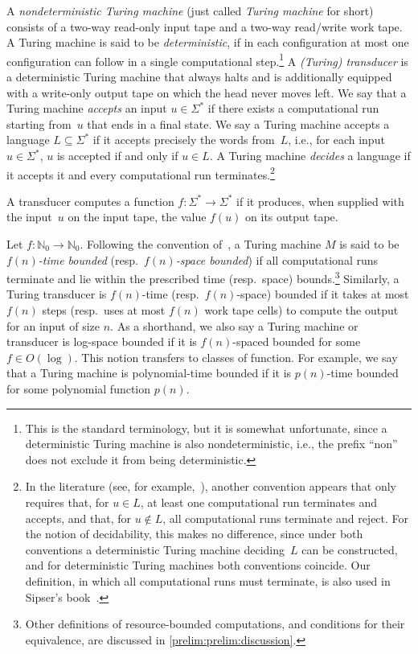 A \emph{nondeterministic Turing machine} (just called \emph{Turing machine} for short) consists of a two-way read-only input tape
and a two-way read/write work tape. 
A Turing machine is said to be \emph{deterministic}, if in each configuration
at most one configuration can follow in a single computational step.\footnote{This is the standard terminology, but it is somewhat unfortunate, since a deterministic Turing machine is also nondeterministic, i.e., the prefix ``non'' does not exclude
it from being deterministic.}
A \emph{(Turing) transducer} is a deterministic Turing machine that always halts and
is additionally equipped with a write-only output tape on which the head never moves left. 
We say that a Turing machine \emph{accepts} an input $u \in \Sigma^*$
if there exists a computational run starting from~$u$ that ends in a final state.
We say a Turing machine accepts a language $L \subseteq \Sigma^*$ if it accepts precisely the words from~$L$, i.e., for each input $u \in \Sigma^*$,
$u$ is accepted if and only if $u \in L$.
A Turing machine \emph{decides}
a language if it accepts it and every computational run terminates.\footnote{
	In the literature (see, for example,~\cite[Sec.~2.1.2]{DBLP:books/daglib/0023084}), another convention appears that only requires that, for $u \in L$, at least one computational run terminates and accepts, and that, for $u \notin L$, all computational runs terminate and reject.
	For the notion of decidability, this makes no difference, since under both conventions a deterministic Turing machine deciding~$L$ can be constructed, and for deterministic Turing machines both conventions coincide.
	Our definition, in which all computational runs must terminate, is also used in Sipser’s book~\cite[Def.~3.6]{sipser2012theory}.
}

A transducer computes a function $f \colon \Sigma^* \to \Sigma^*$
if it produces, when supplied with the input~$u$ on the input tape, the value $f(u)$ on its output tape.

 
Let $f \colon \mathbb N_0 \to \mathbb N_0$.
Following the convention of~\cite[p.~288]{HopUll79},
a Turing machine $M$ 
is said to be \emph{$f(n)$-time bounded} (resp.~\emph{$f(n)$-space bounded}) 
if all computational runs terminate and lie within the prescribed time (resp.~space) bounds.\footnote{Other definitions
	of resource-bounded computations, and conditions for their equivalence,
	are discussed in \cref{prelim:prelim:discussion}.}
Similarly, a Turing transducer is $f(n)$-time (resp.~$f(n)$-space) bounded
if it takes at most $f(n)$ steps (resp.~uses at most $f(n)$ work tape cells)
to compute the output for an input of size $n$. 
As a shorthand, we also say a Turing machine or transducer
is log-space bounded if it is $f(n)$-spaced bounded for some $f \in O(\log)$.
This notion transfers to classes of function. For example, we say
that a Turing machine is polynomial-time bounded if it is $p(n)$-time bounded
for some polynomial function $p(n)$.

